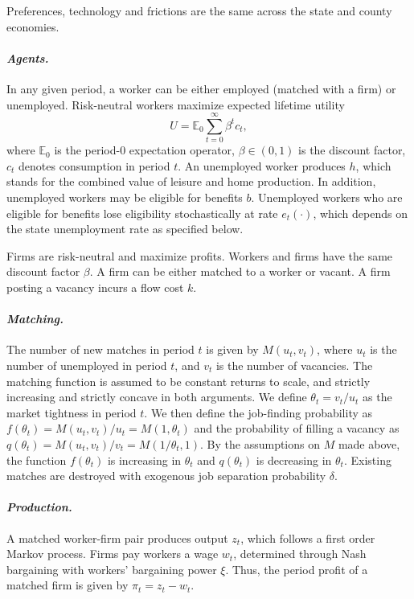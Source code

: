 \documentclass[12pt]{article}
\newcommand{\1}{\mathbf{1}}
\newcommand{\E}{\mathbb{E}}
\begin{document}
\begin{appendix}
Preferences, technology and frictions are the same across the state and county economies.

\vspace{-0.4cm}\paragraph{\textit{Agents.}} In any given period, a worker can be either employed (matched with a firm) or unemployed. Risk-neutral workers maximize expected lifetime utility
\begin{equation*}
U=\E_0 \sum\limits_{t=0}^{\infty} \beta^t c_t,
\end{equation*}
where $\E_0$ is the period-0 expectation operator, $\beta \in \left(0,1\right)$ is the discount factor, $c_t$ denotes consumption in period $t$.  An unemployed worker produces $h$, which stands for the combined value of leisure and home production.  In addition, unemployed workers may be eligible for benefits $b$.  Unemployed workers who are eligible for benefits lose eligibility stochastically at rate $e_t(\cdot)$, which depends on the state unemployment rate as specified below.

Firms are risk-neutral and maximize profits. Workers and firms have the same discount factor $\beta$. A firm can be either matched to a worker or vacant. A firm posting a vacancy incurs a flow cost $k$.

\vspace{-0.4cm}\paragraph{\textit{Matching.}}
The number of new matches in period $t$ is given by $M(u_t,v_t)$, where $u_t$ is the number of unemployed in period $t$, and $v_t$ is the number of vacancies.  The matching function is assumed to be constant returns to scale, and strictly increasing and strictly concave in both arguments.  We define $\theta_t=v_t/u_t$ as the market tightness in period $t$. We then define the job-finding probability as $f(\theta_t)=M(u_t,v_t)/u_t=M(1,\theta_t)$ and the probability of filling a vacancy as $q(\theta_t)=M(u_t,v_t)/v_t=M(1/\theta_t,1)$. By the assumptions on $M$ made above, the function $f(\theta_t)$ is increasing in $\theta_t$ and $q(\theta_t)$ is decreasing in $\theta_t$. Existing matches are destroyed with exogenous job separation probability $\delta$.

\vspace{-0.4cm}\paragraph{\textit{Production.}}  A matched worker-firm pair produces output $z_t$, which follows a first order Markov process.  Firms pay workers a wage $w_t$, determined through Nash bargaining with workers' bargaining power $\xi$. Thus, the period profit of a matched firm is given by $\pi_t = z_t - w_t$.



\end{appendix}
\end{document}
